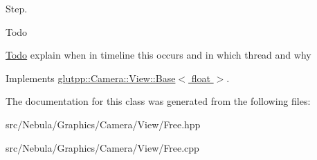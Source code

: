 \-Step. 

\begin{DoxyRefDesc}{\-Todo}
\item[\hyperlink{todo__todo000004}{\-Todo}]explain when in timeline this occurs and in which thread and why \end{DoxyRefDesc}


\-Implements \hyperlink{classglutpp_1_1Camera_1_1View_1_1Base_abce83ff7d7f2b50811489ff85cd870c7}{glutpp\-::\-Camera\-::\-View\-::\-Base$<$ float $>$}.



\-The documentation for this class was generated from the following files\-:\begin{DoxyCompactItemize}
\item 
src/\-Nebula/\-Graphics/\-Camera/\-View/\-Free.\-hpp\item 
src/\-Nebula/\-Graphics/\-Camera/\-View/\-Free.\-cpp\end{DoxyCompactItemize}
